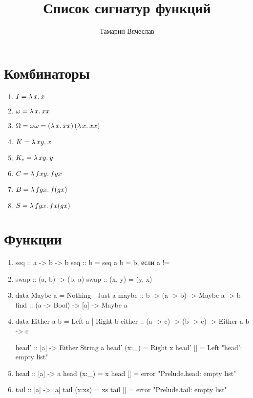 \documentclass[12pt,a4paper]{article}
\title{Список сигнатур функций}
\author{Тамарин Вячеслав}
\begin{document}
\maketitle

\section{Комбинаторы}
\begin{enumerate}[noitemsep]
	\item $ I = \lambda\,{x}.\:{x}$
	\item $ \omega = \lambda\,{x}.\:{x x}$
	\item $ \Omega = \omega \omega = \left( \lambda\,{x}.\:{x x} \right) \left( \lambda\,{x}.\:{x x} \right) $
	\item $ K = \lambda\,{x y}.\:{x}$
	\item  $ K_{*} = \lambda\,{x y}.\:{y}$
	\item $ C = \lambda\,{f x y}.\:{f y x}$ 
	\item $ B = \lambda\,{f g x}.\:{f (g x)}$
	\item $ S = \lambda\,{f g x}.\:{f x (g x)}$
\end{enumerate} 
\section{Функции}
\begin{enumerate}
\item 
\begin{hscode}
seq :: a -> b -> b
seq :: \bot b =  \bot
seq a b = b, если a != \bot
\end{hscode}
\item
\begin{hscode}
swap :: (a, b) -> (b, a)
swap :: (x, y) = (y, x)
\end{hscode}
\item
\begin{hscode}
data Maybe a = Nothing | Just a
maybe :: b -> (a -> b) -> Maybe a -> b
find :: (a -> Bool) -> [a] -> Maybe a
\end{hscode}
\item
\begin{hscode}
data Either a b = Left a | Right b
either :: (a -> c) -> (b -> c) -> Either a b -> c

head' :: [a] -> Either String a
head' (x:_) = Right x
head' [] = Left "head': empty list"
\end{hscode}
\item
\begin{hscode}
head :: [a] -> a
head (x:_) = x
head [] = error "Prelude.head: empty list"
\end{hscode}
\item
\begin{hscode}
tail :: [a] -> [a]
tail (x:xs) = xs
tail [] = error "Prelude.tail: empty list"
\end{hscode}


\end{enumerate} 
\end{document}
